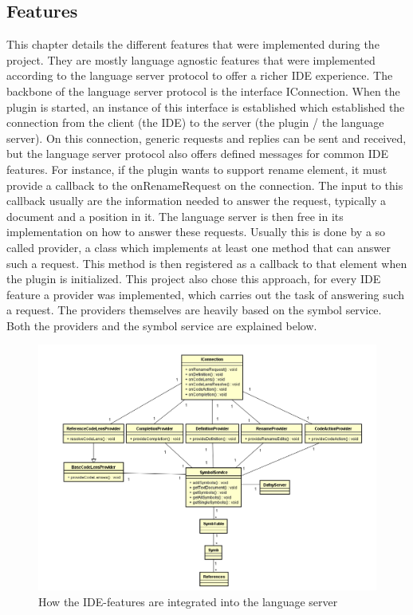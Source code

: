 \subsection{Features} \label{features}
This chapter details the different features that were implemented during the project. They are mostly language agnostic features that were implemented according to the language server protocol to offer a richer IDE experience. The backbone of the language server protocol is the interface IConnection. When the plugin is started, an instance of this interface is established which established the connection from the client (the IDE) to the server (the plugin / the language server). On this connection, generic requests and replies can be sent and received, but the language server protocol also offers defined messages for common IDE features. \newline
For instance, if the plugin wants to support rename element, it must provide a callback to the onRenameRequest on the connection. The input to this callback usually are the information needed to answer the request, typically a document and a position in it. The language server is then free in its implementation on how to answer these requests. \newline
Usually this is done by a so called provider, a class which implements at least one method that can answer such a request. This method is then registered as a callback to that element when the plugin is initialized.\newline
This project also chose this approach, for every IDE feature a provider was implemented, which carries out the task of answering such a request. The providers themselves are heavily based on the symbol service. Both the providers and the symbol service are explained below. 


\begin{figure}[H]
	\centering
	\includegraphics[width=1\textwidth]{img/featureArchitecture}
	\caption{How the IDE-features are integrated into the language server}
	\label{fig:featurearchitecture}
\end{figure}


